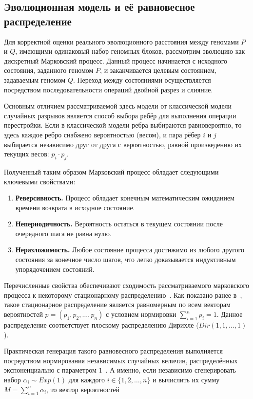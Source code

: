 \subsection{Эволюционная модель и её равновесное распределение}

Для корректной оценки реального эволюционного расстояния между геномами $P$ и $Q$, имеющими одинаковый набор геномных блоков, рассмотрим эволюцию как дискретный Марковский процесс.
Данный процесс начинается с исходного состояния, заданного геномом $P$, и заканчивается целевым состоянием, задаваемым геномом $Q$.
Переход между состояниями осуществляется посредством последовательности операций двойной разрез и слияние.

Основным отличием рассматриваемой здесь модели от классической модели случайных разрывов является способ выбора ребёр для выполнения операции перестройки.
Если в классической модели ребра выбираются равновероятно, то здесь каждое ребро снабжено вероятностью (весом), и пара рёбер $i$ и $j$ выбирается независимо друг от друга с вероятностью, равной произведению их текущих весов: $p_i \cdot p_j$.

Полученный таким образом Марковский процесс обладает следующими ключевыми свойствами:

\begin{enumerate}
    \item \textbf{Реверсивность.} Процесс обладает конечным математическим ожиданием времени возврата в исходное состояние.
    \item \textbf{Непериодичность.} Вероятность остаться в текущем состоянии после очередного шага не равна нулю.
    \item \textbf{Неразложимость.} Любое состояние процесса достижимо из любого другого состояния за конечное число шагов, что легко доказывается индуктивным упорядочением состояний.
\end{enumerate}

Перечисленные свойства обеспечивают сходимость рассматриваемого марковского процесса к некоторому стационарному распределению~\cite{teor-ver}.
Как показано ранее в~\cite{tannier2016}, такое стационарное распределение является равномерным по всем векторам вероятностей $p = (p_1, p_2, \dots, p_n)$ с условием нормировки $\sum_{i=1}^{n} p_i = 1$.
Данное распределение соответствует плоскому распределению Дирихле ($Dir(1, 1, \dots, 1)$).

Практическая генерация такого равновесного распределения выполняется посредством нормирования независимых случайных величин, распределённых экспоненциально с параметром $1$~\cite{generation}.
А именно, если независимо сгенерировать набор $\alpha_i \sim Exp(1)$ для каждого $i \in \{1,2,\dots,n\}$ и вычислить их сумму $M = \sum_{i=1}^{n} \alpha_i$, то вектор вероятностей


